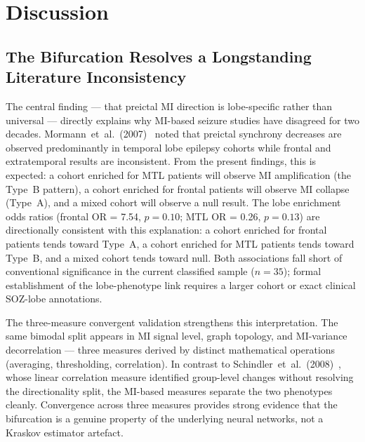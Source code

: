 \documentclass[final,5p,times,twocolumn]{elsarticle}
\begin{document}
\section{Discussion}
\label{sec:discussion}

\subsection{The Bifurcation Resolves a Longstanding Literature Inconsistency}

The central finding --- that preictal MI direction is lobe-specific
rather than universal --- directly explains why MI-based seizure studies
have disagreed for two decades.
%
Mormann~et~al.\ (2007)~\cite{mormann2007} noted that preictal synchrony
decreases are observed predominantly in temporal lobe epilepsy cohorts
while frontal and extratemporal results are inconsistent.
%
From the present findings, this is expected: a cohort enriched for MTL
patients will observe MI amplification (the Type~B pattern), a cohort
enriched for frontal patients will observe MI collapse (Type~A), and
a mixed cohort will observe a null result.
%
The lobe enrichment odds ratios (frontal OR = 7.54, $p = 0.10$;
MTL OR = 0.26, $p = 0.13$) are directionally consistent with this
explanation: a cohort enriched for frontal patients tends toward
Type~A, a cohort enriched for MTL patients tends toward Type~B, and
a mixed cohort tends toward null.
%
Both associations fall short of conventional significance in the
current classified sample ($n = 35$); formal establishment of
the lobe-phenotype link requires a larger cohort or exact clinical
SOZ-lobe annotations.

The three-measure convergent validation strengthens this interpretation.
%
The same bimodal split appears in MI signal level, graph topology, and
MI-variance decorrelation --- three measures derived by distinct
mathematical operations (averaging, thresholding, correlation).
%
In contrast to Schindler~et~al.\ (2008)~\cite{schindler2008}, whose
linear correlation measure identified group-level changes without
resolving the directionality split, the MI-based measures separate the
two phenotypes cleanly.
%
Convergence across three measures provides strong evidence that the
bifurcation is a genuine property of the underlying neural networks,
not a Kraskov estimator artefact.
\end{document}
